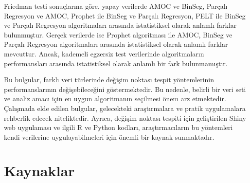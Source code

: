 \documentclass[12pt,twoside]{deuthesis}
\begin{document}
Friedman testi sonuçlarına göre, yapay verilerde AMOC ve BinSeg, Parçalı Regresyon ve AMOC, Prophet ile BinSeg ve Parçalı Regresyon, PELT ile BinSeg ve Parçalı Regresyon algoritmaları arasında istatistiksel olarak anlamlı farklar bulunmuştur. Gerçek verilerde ise Prophet algoritması ile AMOC, BinSeg ve Parçalı Regresyon algoritmaları arasında istatistiksel olarak anlamlı farklar mevcuttur. Ancak, kademeli egzersiz test verilerinde algoritmaların performansları arasında istatistiksel olarak anlamlı bir fark bulunmamıştır.

Bu bulgular, farklı veri türlerinde değişim noktası tespit yöntemlerinin performanslarının değişebileceğini göstermektedir. Bu nedenle, belirli bir veri seti ve analiz amacı için en uygun algoritmanın seçilmesi önem arz etmektedir. Çalışmada elde edilen bulgular, gelecekteki araştırmalara ve pratik uygulamalara rehberlik edecek niteliktedir. Ayrıca, değişim noktası tespiti için geliştirilen Shiny web uygulaması ve ilgili R ve Python kodları, araştırmacıların bu yöntemleri kendi verilerine uygulayabilmeleri için önemli bir kaynak sunmaktadır.

\chapter*{Kaynaklar}\label{kaynaklar}

\end{document}

